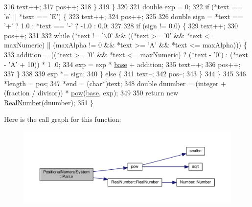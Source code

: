 \begin{DoxyCode}
316             text++;
317             pos++;
318         \}
319     \}
320 
321     \textcolor{keywordtype}{double} \hyperlink{math_8h_ae09128febbbe6372cde4fa0c65608a42}{exp} = 0;
322     \textcolor{keywordflow}{if} (*text == \textcolor{charliteral}{'e'} || *text == \textcolor{charliteral}{'E'}) \{
323         text++;
324         pos++;
325 
326         \textcolor{keywordtype}{double} sign = *text == \textcolor{charliteral}{'+'} ? 1.0 : *text == \textcolor{charliteral}{'-'} ? -1.0 : 0.0;
327 
328         \textcolor{keywordflow}{if} (sign != 0.0) \{
329             text++;
330             pos++;
331 
332             \textcolor{keywordflow}{while} (*text != \textcolor{charliteral}{'\(\backslash\)0'} && ((*text >= \textcolor{charliteral}{'0'} && *text <= maxNumeric) || (maxAlpha != 0 && *text >= \textcolor{charliteral}{
      'A'} && *text <= maxAlpha))) \{
333                 addition = ((*text >= \textcolor{charliteral}{'0'} && *text <= maxNumeric) ? (*text - \textcolor{charliteral}{'0'}) : (*text - \textcolor{charliteral}{'A'} + 10)) * 1
      .0;
334                 exp = exp * \hyperlink{classPositionalNumeralSystem_a50cd19222978e16cc9c8b481c72c4662}{base} + addition;
335                 text++;
336                 pos++;
337             \}
338 
339             exp *= sign;
340         \} \textcolor{keywordflow}{else} \{
341             text--;
342             pos--;
343         \}
344     \}
345 
346     *length = pos;
347     *end = (\textcolor{keywordtype}{char}*)text;
348     \textcolor{keywordtype}{double} dnumber = (integer + (fraction / divisor)) * \hyperlink{math_8h_aa56c9494c95edf68386375e97d64159b}{pow}(\hyperlink{classPositionalNumeralSystem_a50cd19222978e16cc9c8b481c72c4662}{base}, exp);
349 
350     \textcolor{keywordflow}{return} \textcolor{keyword}{new} \hyperlink{structRealNumber}{RealNumber}(dnumber);
351 \}
\end{DoxyCode}


Here is the call graph for this function\+:\nopagebreak
\begin{figure}[H]
\begin{center}
\leavevmode
\includegraphics[width=350pt]{classPositionalNumeralSystem_a6fd2861b5cd8da952191218121df7f56_cgraph}
\end{center}
\end{figure}


